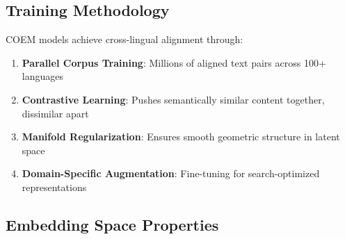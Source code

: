 \subsection{Training Methodology}

COEM models achieve cross-lingual alignment through:

\begin{enumerate}[noitemsep]
    \item \textbf{Parallel Corpus Training}: Millions of aligned text pairs across 100+ languages
    \item \textbf{Contrastive Learning}: Pushes semantically similar content together, dissimilar apart
    \item \textbf{Manifold Regularization}: Ensures smooth geometric structure in latent space
    \item \textbf{Domain-Specific Augmentation}: Fine-tuning for search-optimized representations
\end{enumerate}

\subsection{Embedding Space Properties}

